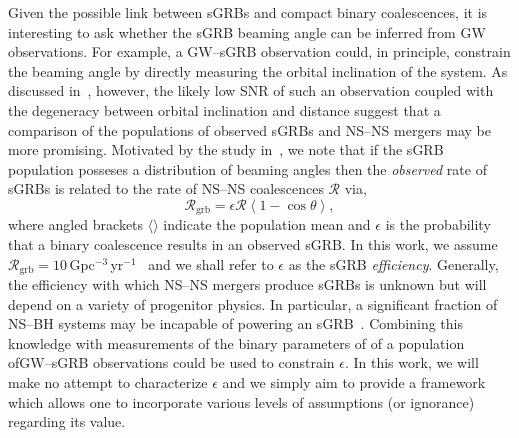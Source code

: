 \documentclass[twocolumn,nofootinbib]{revtex4-1}
\newcommand{\grbrate}{{{\mathcal R}_{\mathrm{grb}}}}
\newcommand{\cbcrate}{{{\mathcal R}}}
\newcommand{\BNS}{\ac{NS}--\ac{NS}\xspace}
\newcommand{\NSBH}{\ac{NS}--\ac{BH}\xspace}
\newcommand{\JOINT}{\ac{GW}--\ac{sGRB}\xspace}
\begin{document}
Given the possible link between \acp{sGRB} and compact binary coalescences, it is interesting to ask whether the \ac{sGRB} beaming angle can be inferred from \ac{GW} observations.
For example, a \JOINT observation could, in principle, constrain the beaming angle by directly measuring the orbital inclination of the system.
As discussed in~\cite{Clark:2014jpa}, however, the likely low \ac{SNR} of such an observation coupled with the degeneracy between orbital inclination and distance suggest that a comparison of the populations of observed \acp{sGRB} and \BNS mergers may be more promising.
Motivated by the study in~\cite{2013PhRvL.111r1101C}, we note that if the \ac{sGRB} population posseses a distribution of beaming angles then the \emph{observed} rate of \acp{sGRB} is related to the rate of \BNS coalescences $\cbcrate$ via,
%
\begin{equation}\label{eq:rate2angle}
    \grbrate = \epsilon\cbcrate \left \langle 1-\cos \theta \right \rangle,
\end{equation}
%
where angled brackets $\langle \rangle$ indicate the population mean and $\epsilon$ is the probability that a binary coalescence results in an observed \ac{sGRB}.
In this work, we assume $\grbrate=10$\,Gpc$^{-3}$\,yr$^{-1}$~\cite{Nakar:2007yr,Dietz:2010eh} and we shall refer to $\epsilon$ as the \ac{sGRB} \emph{efficiency}.
Generally, the efficiency with which \BNS mergers produce \acp{sGRB} is unknown but will depend on a variety of progenitor physics.
In particular, a significant fraction of \NSBH systems may be incapable of powering an \ac{sGRB}~\cite{Pannarale:2014rea}.
Combining this knowledge with measurements of the binary parameters of of a population of\JOINT observations could be used to constrain $\epsilon$.
In this work, we will make no attempt to characterize $\epsilon$ and we simply aim to provide a framework which allows one to incorporate various levels of assumptions (or ignorance) regarding its value.
\end{document}

